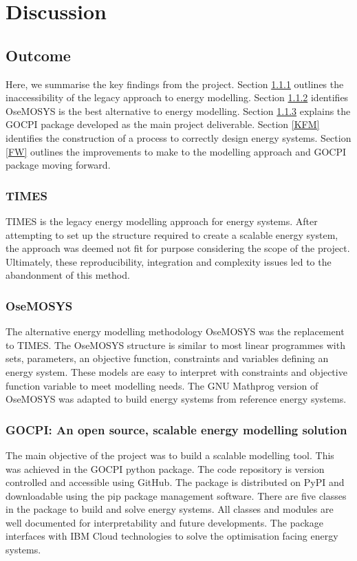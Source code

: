 \documentclass[12pt]{article}
\begin{document}
\section{Discussion}
\subsection{Outcome}
Here, we summarise the key findings from the project. 
Section \ref{KFT} outlines the inaccessibility of the legacy approach to energy modelling.
Section \ref{KFO} identifies OseMOSYS is the best alternative to energy modelling.
Section \ref{KFG} explains the GOCPI package developed as the main project deliverable.
Section \ref{KFM} identifies the construction of a process to correctly design energy systems.
Section \ref{FW} outlines the improvements to make to the modelling approach and GOCPI package moving forward.
\subsubsection{TIMES} \label{KFT}
TIMES is the legacy energy modelling approach for energy systems. 
After attempting to set up the structure required to create a scalable energy system, the approach was deemed not fit for purpose considering the scope of the project.
Ultimately, these reproducibility, integration and complexity issues led to the abandonment of this method.
\subsubsection{OseMOSYS}\label{KFO}
The alternative energy modelling methodology OseMOSYS was the replacement to TIMES.
The OseMOSYS structure is similar to most linear programmes with sets, parameters, an objective function, constraints and variables defining an energy system.
These models are easy to interpret with constraints and objective function variable to meet modelling needs.
The GNU Mathprog version of OseMOSYS was adapted to build energy systems from reference energy systems.
\subsubsection{GOCPI: An open source, scalable energy modelling solution}\label{KFG}
The main objective of the project was to build a scalable modelling tool.
This was achieved in the GOCPI python package. The code repository is version controlled and accessible using GitHub.
The package is distributed on PyPI and downloadable using the pip package management software.
There are five classes in the package to build and solve energy systems.
All classes and modules are well documented for interpretability and future developments.
The package interfaces with IBM Cloud technologies to solve the optimisation facing energy systems.
\end{document}
